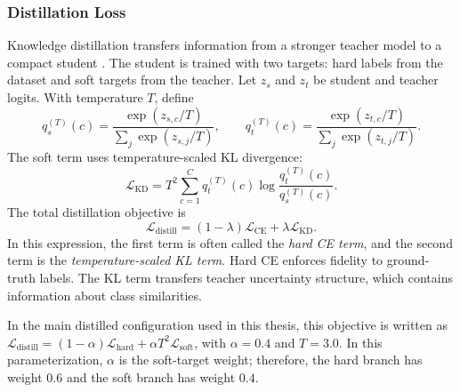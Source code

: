 \documentclass[a4paper,singleside,12pt]{report} %
\begin{document}
	\subsubsection{Distillation Loss}
	Knowledge distillation transfers information from a stronger teacher model to a compact student \cite{hinton2015distilling}. The student is trained with two targets: hard labels from the dataset and soft targets from the teacher. Let \(z_s\) and \(z_t\) be student and teacher logits. With temperature \(T\), define
	\begin{equation}
		q_s^{(T)}(c)=\frac{\exp(z_{s,c}/T)}{\sum_j \exp(z_{s,j}/T)}, \qquad
		q_t^{(T)}(c)=\frac{\exp(z_{t,c}/T)}{\sum_j \exp(z_{t,j}/T)}.
	\end{equation}
	The soft term uses temperature-scaled KL divergence:
	\begin{equation}
		\mathcal{L}_{\mathrm{KD}} = T^2 \sum_{c=1}^{C} q_t^{(T)}(c)\log \frac{q_t^{(T)}(c)}{q_s^{(T)}(c)}.
	\end{equation}
	The total distillation objective is
	\begin{equation}
		\mathcal{L}_{\mathrm{distill}} = (1-\lambda)\mathcal{L}_{\mathrm{CE}} + \lambda \mathcal{L}_{\mathrm{KD}}.
	\end{equation}
	In this expression, the first term is often called the \emph{hard CE term}, and the second term is the \emph{temperature-scaled KL term}. Hard CE enforces fidelity to ground-truth labels. The KL term transfers teacher uncertainty structure, which contains information about class similarities.

	In the main distilled configuration used in this thesis, this objective is written as \(\mathcal{L}_{\mathrm{distill}}=(1-\alpha)\mathcal{L}_{\mathrm{hard}}+\alpha T^2\mathcal{L}_{\mathrm{soft}}\), with \(\alpha=0.4\) and \(T=3.0\). In this parameterization, \(\alpha\) is the soft-target weight; therefore, the hard branch has weight \(0.6\) and the soft branch has weight \(0.4\).
\end{document}
